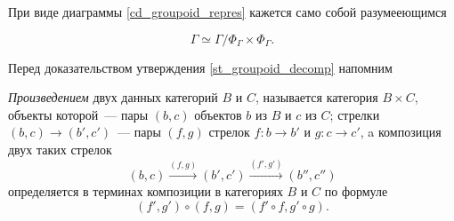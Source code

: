     При виде диаграммы \ref{cd_groupoid_repres} кажется само собой разумееющимся
    \begin{statement}\label{st_groupoid_decomp}
        \begin{equation}
            \Gamma \simeq \textstyle{\Gamma / \Phi_\Gamma \times \Phi_\Gamma}.
        \end{equation}
    \end{statement}

    Перед доказательством утверждения \ref{st_groupoid_decomp} напомним
    \begin{definition}\cite{MacLane}
        \emph{Произведением} двух данных категорий $B$ и $C$, называется 
        категория $B \times C$, объекты которой~--- пары $(b,c)$ объектов $b$ из 
        $B$ и $c$ из $C$; стрелки $(b,c) \to (b',c')$~--- пары $(f,g)$ стрелок 
        $f : b \to b'$ и $g : c \to c'$, a композиция двух таких стрелок
        \[(b,c) \stackrel{(f,g)}{\longrightarrow} (b',c') \stackrel{(f',g')}{\longrightarrow} (b'',c'')\]
        определяется в терминах композиции в категориях $B$ и $C$ по формуле
        \[(f',g') \circ (f,g) = (f' \circ f, g' \circ g).\]
    \end{definition}

